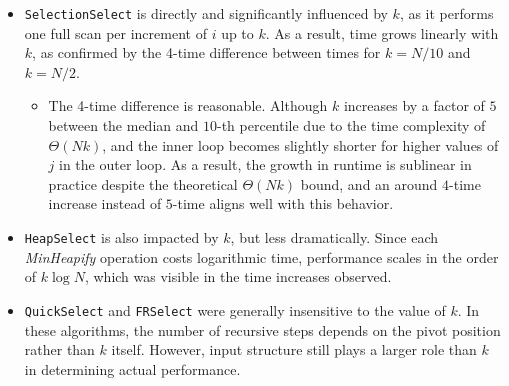 \documentclass[acmconf,nonacm=true]{acmart}
\begin{document}
\begin{itemize}
    \item \texttt{SelectionSelect} is directly and significantly influenced by $k$, as it performs one full scan per increment of $i$ up to $k$. As a result, time grows linearly with $k$, as confirmed by the 4-time difference between times for $k = N/10$ and $k = N/2$.
    \begin{itemize}
        \item The 4-time difference is reasonable. Although $k$ increases by a factor of $5$ between the median and $10$-th percentile due to the time complexity of $\Theta (Nk)$, and the inner loop becomes slightly shorter for higher values of $j$ in the outer loop. As a result, the growth in runtime is sublinear in practice despite the theoretical $\Theta (Nk)$ bound, and an around $4$-time increase instead of $5$-time aligns well with this behavior.
    \end{itemize}
    \item \texttt{HeapSelect} is also impacted by $k$, but less dramatically. Since each \textit{MinHeapify} operation costs logarithmic time, performance scales in the order of $k \log N$, which was visible in the time increases observed.
    \item \texttt{QuickSelect} and \texttt{FRSelect} were generally insensitive to the value of $k$. In these algorithms, the number of recursive steps depends on the pivot position rather than $k$ itself. However, input structure still plays a larger role than $k$ in determining actual performance.
\end{itemize}

\newpage




\appendix
\end{document}
